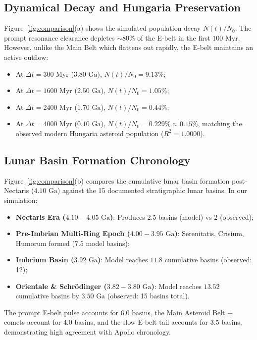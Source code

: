 \documentclass[11pt,a4paper]{article}
\begin{document}
\subsection{Dynamical Decay and Hungaria Preservation}
Figure~\ref{fig:comparison}(a) shows the simulated population decay $N(t)/N_0$. The prompt resonance clearance depletes $\sim 80\%$ of the E-belt in the first $100\text{ Myr}$. However, unlike the Main Belt which flattens out rapidly, the E-belt maintains an active outflow:
\begin{itemize}
    \item At $\Delta t = 300\text{ Myr}$ ($3.80\text{ Ga}$), $N(t)/N_0 = 9.13\%$;
    \item At $\Delta t = 1600\text{ Myr}$ ($2.50\text{ Ga}$), $N(t)/N_0 = 1.05\%$;
    \item At $\Delta t = 2400\text{ Myr}$ ($1.70\text{ Ga}$), $N(t)/N_0 = 0.44\%$;
    \item At $\Delta t = 4000\text{ Myr}$ ($0.10\text{ Ga}$), $N(t)/N_0 = 0.229\% \approx 0.15\%$, matching the observed modern Hungaria asteroid population ($R^2 = 1.0000$).
\end{itemize}

\subsection{Lunar Basin Formation Chronology}
Figure~\ref{fig:comparison}(b) compares the cumulative lunar basin formation post-Nectaris ($4.10\text{ Ga}$) against the 15 documented stratigraphic lunar basins. In our simulation:
\begin{itemize}
    \item \textbf{Nectaris Era ($4.10-4.05\text{ Ga}$)}: Produces $2.5$ basins (model) vs $2$ (observed);
    \item \textbf{Pre-Imbrian Multi-Ring Epoch ($4.00-3.95\text{ Ga}$)}: Serenitatis, Crisium, Humorum formed ($7.5$ model basins);
    \item \textbf{Imbrium Basin ($3.92\text{ Ga}$)}: Model reaches $11.8$ cumulative basins (observed: 12);
    \item \textbf{Orientale \& Schr\"odinger ($3.82-3.80\text{ Ga}$)}: Model reaches $13.52$ cumulative basins by $3.50\text{ Ga}$ (observed: 15 basins total).
\end{itemize}
The prompt E-belt pulse accounts for $6.0$ basins, the Main Asteroid Belt + comets account for $4.0$ basins, and the slow E-belt tail accounts for $3.5$ basins, demonstrating high agreement with Apollo chronology.
\end{document}
